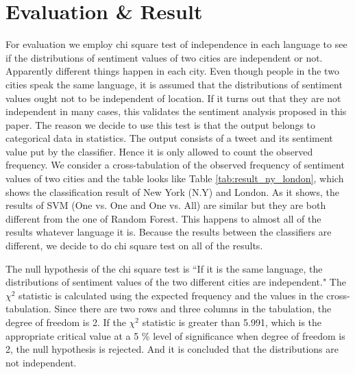 \documentclass[twocolumn]{article}
\begin{document}
\section{Evaluation \& Result}
\vspace{-2mm}
For evaluation we employ chi square test of independence in each language to see if the distributions of sentiment values of two cities are independent or not. 
Apparently different things happen in each city.
Even though people in the two cities speak the same language, it is assumed that the distributions of sentiment values ought not to be independent of location.  
If it turns out that they are not independent in many cases, this validates the sentiment analysis proposed in this paper.
The reason we decide to use this test is that the output belongs to categorical data in statistics.
The output consists of a tweet and its sentiment value put by the classifier.
Hence it is only allowed to count the observed frequency.
We consider a cross-tabulation of the observed frequency of sentiment values of two cities and the table looks like Table \ref{tab:result_ny_london}, which shows the classification result of New York (N.Y) and London.
As it shows, the results of SVM (One vs. One and One vs. All) are similar but they are both different from the one of Random Forest.
This happens to almost all of the results whatever language it is.
Because the results between the classifiers are different, we decide to do chi square test on all of the results.

The null hypothesis of the chi square test is ``If it is the same language, the distributions of sentiment values of the two different cities are independent."
The $\chi^2$ statistic is calculated using the expected frequency and the values in the cross-tabulation.
Since there are two rows and three columns in the tabulation, the degree of freedom is 2.
If the $\chi^2$ statistic is greater than 5.991, which is the appropriate critical value at a 5 \% level of significance when degree of freedom is 2, the null hypothesis is rejected.
And it is concluded that the distributions are not independent. 
\end{document}
